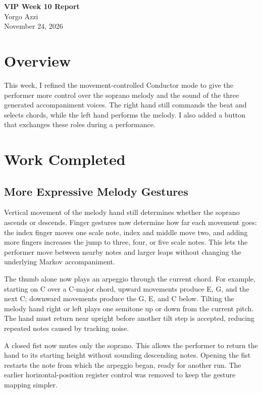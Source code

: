 \documentclass[11pt,a4paper]{article}
\begin{document}
\begin{center}
    {\Large\bfseries VIP Week 10 Report}\\[0.5em]
    {\large Yorgo Azzi}\\[0.25em]
    November 24, 2026
\end{center}

\section{Overview}

This week, I refined the movement-controlled Conductor mode to give the
performer more control over the soprano melody and the sound of the three
generated accompaniment voices. The right hand still commands the beat and
selects chords, while the left hand performs the melody. I also added a button
that exchanges these roles during a performance.

\section{Work Completed}

\subsection{More Expressive Melody Gestures}

Vertical movement of the melody hand still determines whether the soprano
ascends or descends. Finger gestures now determine how far each movement goes:
the index finger moves one scale note, index and middle move two, and adding
more fingers increases the jump to three, four, or five scale notes. This lets
the performer move between nearby notes and larger leaps without changing the
underlying Markov accompaniment.

The thumb alone now plays an arpeggio through the current chord. For example,
starting on C over a C-major chord, upward movements produce E, G, and the
next C; downward movements produce the G, E, and C below. Tilting the melody
hand right or left plays one semitone up or down from the current pitch. The
hand must return near upright before another tilt step is accepted, reducing
repeated notes caused by tracking noise.

A closed fist now mutes only the soprano. This allows the performer to return
the hand to its starting height without sounding descending notes. Opening
the fist restarts the note from which the arpeggio began, ready for another
run. The earlier horizontal-position register control was removed to keep the
gesture mapping simpler.
\end{document}
